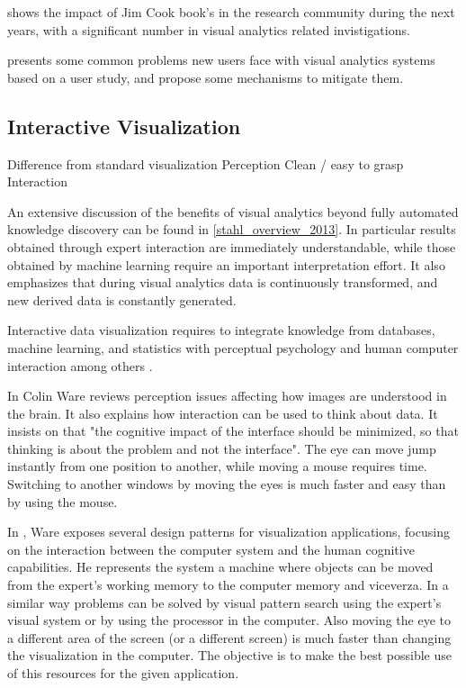 \autocite{chen_illuminated_2012} shows the impact of Jim Cook book's in the research community during the next years, with a significant number in visual analytics related invistigations.

\autocite{chul_kwon_visual_2011} presents some common problems new users face with visual analytics systems based on a user study, and propose some mechanisms to mitigate them.

\subsection{Interactive Visualization}

Difference from standard visualization
Perception
Clean / easy to grasp
Interaction


An extensive discussion of the benefits of visual analytics beyond fully automated knowledge discovery can be found in \ref{stahl_overview_2013}. In particular results obtained through expert interaction are immediately understandable, while those obtained by machine learning require an important interpretation effort. It also emphasizes that during visual analytics data is continuously transformed, and new derived data is constantly generated.

Interactive data visualization requires to integrate knowledge from databases, machine learning, and statistics with perceptual psychology and human computer interaction among others \autocite{ward_interactive_2010}.

In \autocite{ware_information_2004} Colin Ware reviews perception issues affecting how images are understood in the brain. It also explains how interaction can be used to think about data. It insists on that "the cognitive impact of the interface should be minimized, so that thinking is about the problem and not the interface". The eye can move jump instantly from one position to another, while moving a mouse requires time. Switching to another windows by moving the eyes is much faster and easy than by using the mouse.

		
In \autocite{ware_visual_2013}, Ware exposes several design patterns for visualization applications, focusing on the interaction between the computer system and the human cognitive capabilities. He represents the system a machine where objects can be moved from the expert's working memory to the computer memory and viceverza. In a similar way problems can be solved by visual pattern search using the expert's visual system or by using the processor in the computer. Also moving the eye to a different area of the screen (or a different screen) is much faster than changing the visualization in the computer.
The objective is to make the best possible use of this resources for the given application. 


